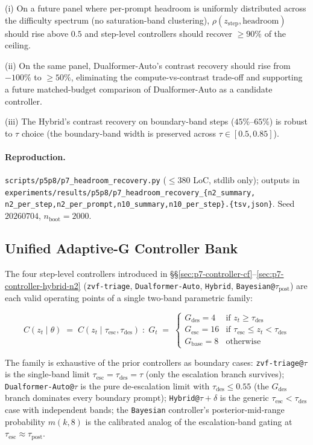 (i) On a future panel where per-prompt headroom is uniformly
distributed across the difficulty spectrum (no saturation-band
clustering), $\rho(z_{\mathrm{step}}, \mathrm{headroom})$ should
rise above $0.5$ and step-level controllers should recover
$\ge 90\%$ of the ceiling.

(ii) On the same panel, Dualformer-Auto's contrast recovery should
rise from $-100\%$ to $\ge 50\%$, eliminating the compute-vs-contrast
trade-off and supporting a future matched-budget comparison of
Dualformer-Auto as a candidate controller.

(iii) The Hybrid's contrast recovery on boundary-band steps
($45$\%--$65\%$) is robust to $\tau$ choice (the boundary-band width
is preserved across $\tau \in [0.5, 0.85]$).

\paragraph{Reproduction.}
\texttt{scripts/p5p8/p7\_headroom\_recovery.py}
($\leq 380$ LoC, stdlib only); outputs in
\texttt{experiments/results/p5p8/p7\_headroom\_recovery\_\{n2\_summary,
n2\_per\_step,n2\_per\_prompt,n10\_summary,n10\_per\_step\}.\{tsv,json\}}.
Seed $20260704$, $n_{\mathrm{boot}}{=}2000$.


\subsection{Unified Adaptive-G Controller Bank}
\label{sec:p7-controller-bank}

The four step-level controllers introduced in
\S\S\ref{sec:p7-controller-cf}--\ref{sec:p7-controller-hybrid-n2}
(\texttt{zvf-triage}, \texttt{Dualformer-Auto}, \texttt{Hybrid},
\texttt{Bayesian@$\tau_{\mathrm{post}}$}) are each valid operating
points of a single two-band parametric family:

\begin{equation}
C(z_t \mid \theta) \;=\; C(z_t \mid \tau_{\mathrm{esc}}, \tau_{\mathrm{des}}) \;:\;
G_t \;=\; \begin{cases}
G_{\mathrm{des}}=4 & \text{if } z_t \ge \tau_{\mathrm{des}} \\
G_{\mathrm{esc}}=16 & \text{if } \tau_{\mathrm{esc}} \le z_t < \tau_{\mathrm{des}} \\
G_{\mathrm{base}}=8 & \text{otherwise}
\end{cases}
\label{eq:p7-unified}
\end{equation}

The family is exhaustive of the prior controllers as boundary cases:
\texttt{zvf-triage@$\tau$} is the single-band limit
$\tau_{\mathrm{esc}}=\tau_{\mathrm{des}}=\tau$ (only the escalation
branch survives); \texttt{Dualformer-Auto@$\tau$} is the pure
de-escalation limit with $\tau_{\mathrm{des}}\le 0.55$ (the
$G_{\mathrm{des}}$ branch dominates every boundary prompt);
\texttt{Hybrid@$\tau+\delta$} is the generic $\tau_{\mathrm{esc}} < \tau_{\mathrm{des}}$
case with independent bands; the \texttt{Bayesian} controller's
posterior-mid-range probability $m(k,8)$ is the calibrated analog
of the escalation-band gating at $\tau_{\mathrm{esc}}\approx \tau_{\mathrm{post}}$.

